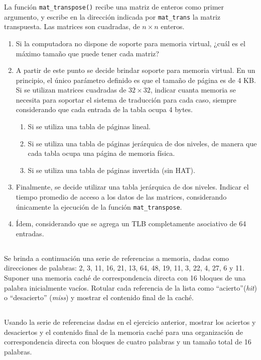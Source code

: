 La función \texttt{mat\_transpose()} recibe una matriz de enteros como primer argumento, y escribe
en la dirección indicada por \texttt{mat\_trans} la matriz transpuesta. Las matrices son cuadradas, de $n
\times n$ enteros.

\begin{enumerate}[label=\alph*)]
 \item Si la computadora no dispone de soporte para memoria virtual, ¿cuál es el máximo tamaño
que puede tener cada matriz?
 \item A partir de este punto se decide brindar soporte para memoria virtual. En un principio, el
único parámetro definido es que el tamaño de página es de 4 KB. Si se utilizan matrices cuadradas de $32 \times 32$, indicar cuanta memoria se necesita para soportar el sistema de traducción
para cada caso, siempre considerando que cada entrada de la tabla ocupa 4 bytes.
 
\begin{enumerate}[label=\roman*)]
 \item Si se utiliza una tabla de páginas lineal. 
 \item Si se utiliza una tabla de páginas jerárquica de dos niveles, de manera que cada tabla ocupa una página de memoria física.
 \item Si se utiliza una tabla de páginas invertida (sin HAT).
\end{enumerate}

 \item Finalmente, se decide utilizar una tabla jerárquica de dos niveles. Indicar el tiempo promedio
de acceso a los datos de las matrices, considerando únicamente la ejecución de la función
\texttt{mat\_transpose}.
 \item Ídem, considerando que se agrega un TLB completamente asociativo de 64 entradas.
\end{enumerate}

\subsection{}
Se brinda a continuación una serie de referencias a memoria, dadas como direcciones de palabras: 2, 3, 11, 16, 21, 13, 64, 48, 19, 11, 3, 22, 4, 27, 6 y 11. Suponer una memoria caché de correspondencia directa con 16 bloques de una palabra inicialmente vacíos. Rotular cada referencia de la lista como ``acierto''(\textit{hit}) o ``desacierto'' (\textit{miss}) y mostrar el contenido final de la caché.

\subsection{}
Usando la serie de referencias dadas en el ejercicio anterior, mostrar los aciertos y desaciertos y el contenido final de la memoria caché para una organización de correspondencia directa con bloques de cuatro palabras y un tamaño total de 16 palabras.

